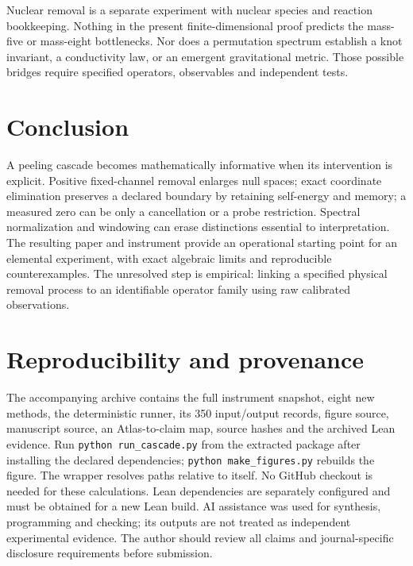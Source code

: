 \documentclass[11pt]{article}
\begin{document}
Nuclear removal is a separate experiment with nuclear species and reaction bookkeeping. Nothing in the present finite-dimensional proof predicts the mass-five or mass-eight bottlenecks. Nor does a permutation spectrum establish a knot invariant, a conductivity law, or an emergent gravitational metric. Those possible bridges require specified operators, observables and independent tests.

\section{Conclusion}
A peeling cascade becomes mathematically informative when its intervention is explicit. Positive fixed-channel removal enlarges null spaces; exact coordinate elimination preserves a declared boundary by retaining self-energy and memory; a measured zero can be only a cancellation or a probe restriction. Spectral normalization and windowing can erase distinctions essential to interpretation. The resulting paper and instrument provide an operational starting point for an elemental experiment, with exact algebraic limits and reproducible counterexamples. The unresolved step is empirical: linking a specified physical removal process to an identifiable operator family using raw calibrated observations.

\section*{Reproducibility and provenance}
The accompanying archive contains the full instrument snapshot, eight new methods, the deterministic runner, its 350 input/output records, figure source, manuscript source, an Atlas-to-claim map, source hashes and the archived Lean evidence. Run \texttt{python run\_cascade.py} from the extracted package after installing the declared dependencies; \texttt{python make\_figures.py} rebuilds the figure. The wrapper resolves paths relative to itself. No GitHub checkout is needed for these calculations. Lean dependencies are separately configured and must be obtained for a new Lean build. AI assistance was used for synthesis, programming and checking; its outputs are not treated as independent experimental evidence. The author should review all claims and journal-specific disclosure requirements before submission.
\end{document}
